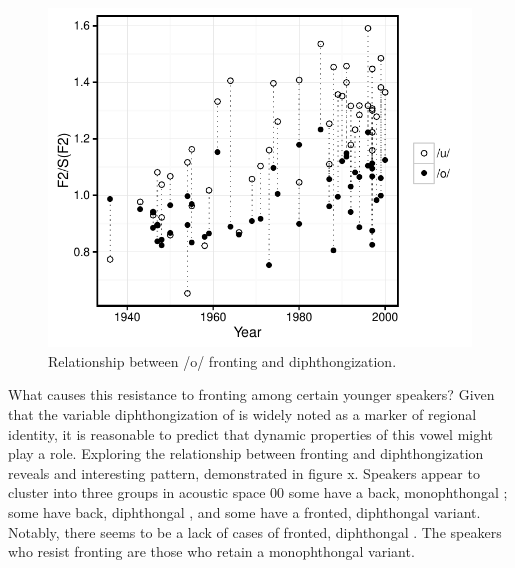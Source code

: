 \documentclass[12pt]{article}
\begin{document}
\begin{figure}
\centering
\includegraphics[scale=.75]{resistance1.pdf}
\caption{Relationship between /o/ fronting and diphthongization.}
\end{figure}

What causes this resistance to fronting among certain younger speakers? Given that the variable diphthongization of  is widely noted as a marker of regional identity, it is reasonable to predict that dynamic properties of this vowel might play a role. Exploring the relationship between fronting and diphthongization reveals and interesting pattern, demonstrated in figure x. Speakers appear to cluster into three groups in acoustic space 00 some have a back, monophthongal ; some have back, diphthongal , and some have a fronted, diphthongal variant. Notably, there seems to be a lack of cases of fronted, diphthongal . The speakers who resist fronting are those who retain a monophthongal variant.
\end{document}
